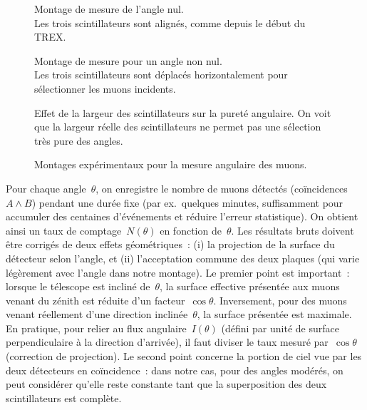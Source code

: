 \documentclass[a4paper,12pt,twoside]{article}
\begin{document}
\begin{figure}
  \begin{minipage}{0.3\textwidth}
    \centering
    
    \caption{Montage de mesure de l'angle nul.\\Les trois scintillateurs sont alignés, comme depuis le début du TREX.}
    \label{fig:angle_nul}
  \end{minipage}
  \hfill
  \begin{minipage}
  {0.3\textwidth}
    \centering
    
    \caption{Montage de mesure pour un angle non nul.\\Les trois scintillateurs sont déplacés horizontalement pour sélectionner les muons incidents.}
    \label{fig:angle_non_nul}
  \end{minipage}
  \hfill
  \begin{minipage}{0.3\textwidth}
    \centering
    
    \caption{Effet de la largeur des scintillateurs sur la pureté angulaire. On voit que la largeur réelle des scintillateurs ne permet pas une sélection très pure des angles.}
    \label{fig:range_des_angles}
  \end{minipage}
  \caption{Montages expérimentaux pour la mesure angulaire des muons.}
\end{figure}
Pour chaque angle~$\theta$, on enregistre le nombre de muons détectés (coïncidences $A\wedge B$) pendant une durée fixe (par ex.\ quelques minutes, suffisamment pour accumuler des centaines d’événements et réduire l’erreur statistique). On obtient ainsi un taux de comptage~$N(\theta)$ en fonction de~$\theta$. Les résultats bruts doivent être corrigés de deux effets géométriques~: (i) la projection de la surface du détecteur selon l'angle, et (ii) l'acceptation commune des deux plaques (qui varie légèrement avec l'angle dans notre montage). Le premier point est important~: lorsque le télescope est incliné de~$\theta$, la surface effective présentée aux muons venant du zénith est réduite d'un facteur~$\cos\theta$. Inversement, pour des muons venant réellement d'une direction inclinée~$\theta$, la surface présentée est maximale. En pratique, pour relier au flux angulaire~$I(\theta)$ (défini par unité de surface perpendiculaire à la direction d'arrivée), il faut diviser le taux mesuré par~$\cos\theta$ (correction de projection). Le second point concerne la portion de ciel vue par les deux détecteurs en coïncidence~: dans notre cas, pour des angles modérés, on peut considérer qu'elle reste constante tant que la superposition des deux scintillateurs est complète.
\end{document}
